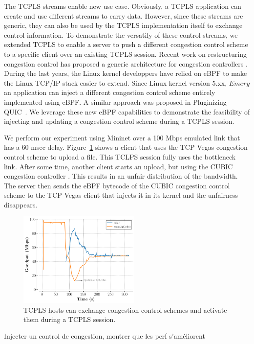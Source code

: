 The TCPLS streams enable new use case. Obviously, a TCPLS application can
create and use different streams to carry data. However, since these streams
are generic, they can also be used by the TCPLS implementation itself to
exchange control information. To demonstrate the versatily of these control
streams, we extended TCPLS to enable a server to push a different congestion
control scheme to a specific client over an existing TCPLS session. Recent
work on restructuring congestion control has proposed a generic architecture
for congestion controllers \cite{narayan2018restructuring}. 
During the last years, the Linux kernel developpers have relied on eBPF
to make the Linux TCP/IP stack \cite{brakmo2017tcp,tran2020beyond} easier
to extend. Since Linux kernel version 5.xx, $Emery$ an application can inject
a different congestion control scheme entirely implemented using eBPF. A similar approach was proposed in Pluginizing QUIC~\cite{de2019pluginizing}.
We leverage these new eBPF capabilities to
demonstrate the feasibility of injecting and
updating a congestion control scheme during a TCPLS session.

We perform our experiment using Mininet over a 100 Mbps emulated link that has a 60 msec delay. Figure~\ref{fig:vegasCubic} shows a client that uses the TCP Vegas \cite{10.1145/190314.190317} congestion control scheme to upload a file. This TCLPS session fully uses the bottleneck link. After some time, another client starts an upload, but using the CUBIC congestion controller \cite{rfc8312}. This results in an unfair distribution of the bandwidth. The server then sends the eBPF bytecode of the CUBIC congestion control scheme to the TCP Vegas client that injects it in its kernel and the unfairness disappears.

\begin{figure}[!t]
  \begin{center}
    \includegraphics[width=6cm]{pretty_plotify/plots/vegas_cubic.png}
  \end{center}
  \caption{TCPLS hosts can exchange congestion control schemes and activate them during a TCPLS session.}
  \label{fig:vegasCubic}
\end{figure}











Injecter un control de congestion, montrer que les perf s'améliorent
